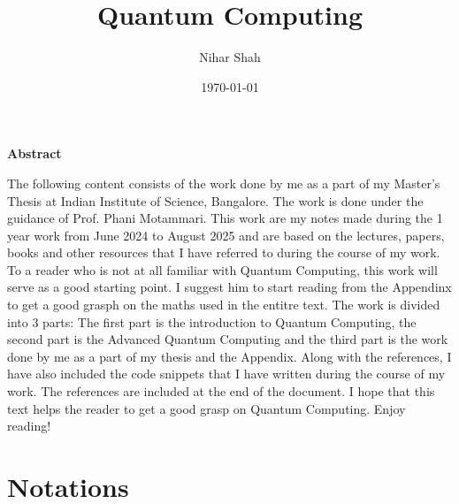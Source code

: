 \documentclass[12pt, oneside]{book}
\theoremstyle{definition}
\theoremstyle{definition}
\theoremstyle{remark}
\newcommand{\abstractname}{Abstract}  %
\newenvironment{abstract}{%
\clearpage
\null\vfill
\begin{center}%
    \bfseries \abstractname
\end{center}}%
{\vfill\null}
\begin{document}
\frontmatter  %

\title{\vspace{-3.0cm}Quantum Computing}  %
\author{Nihar Shah}  %
\date{\today}  %
\maketitle  %

\begin{abstract}
The following  content consists of the work done by me as a part of my Master's Thesis at Indian
Institute of Science, Bangalore. The work is done under the guidance of Prof. Phani Motammari. 
This work are my notes made during the 1 year work from June 2024 to August 2025 and are based on the
lectures, papers, books and other resources that I have referred to during the course of my work.
To a reader who is not at all familiar with Quantum Computing, this work will serve as a good starting point. 
I suggest him to start reading from the Appendinx to get a good grasph on the maths used in the entitre text. 
The work is divided into 3 parts: The first part is the introduction to Quantum Computing, the second part is the
Advanced Quantum Computing and the third part is the work done by me as a part of my thesis and the Appendix. Along with the references, 
I have also included the code snippets that I have written during the course of my work. The references are included at the end of the document.
I hope that this text helps the reader to get a good grasp on Quantum Computing. Enjoy reading!

\end{abstract}

\tableofcontents  %

\listoffigures  %

\listoftables  %

\chapter*{Notations} %
\end{document}
